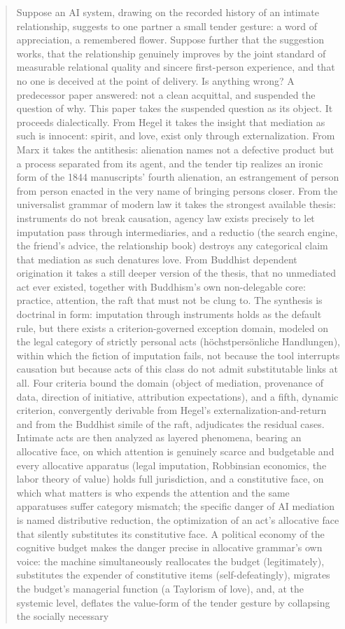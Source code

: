 \documentclass[11pt,a4paper]{article}
\begin{document}
\begin{abstract}
\noindent
Suppose an AI system, drawing on the recorded history of an intimate relationship, suggests to one partner a small tender gesture: a word of appreciation, a remembered flower. Suppose further that the suggestion works, that the relationship genuinely improves by the joint standard of measurable relational quality and sincere first-person experience, and that no one is deceived at the point of delivery. Is anything wrong? A predecessor paper answered: not a clean acquittal, and suspended the question of why. This paper takes the suspended question as its object. It proceeds dialectically. From Hegel it takes the insight that mediation as such is innocent: spirit, and love, exist only through externalization. From Marx it takes the antithesis: alienation names not a defective product but a process separated from its agent, and the tender tip realizes an ironic form of the 1844 manuscripts' fourth alienation, an estrangement of person from person enacted in the very name of bringing persons closer. From the universalist grammar of modern law it takes the strongest available thesis: instruments do not break causation, agency law exists precisely to let imputation pass through intermediaries, and a reductio (the search engine, the friend's advice, the relationship book) destroys any categorical claim that mediation as such denatures love. From Buddhist dependent origination it takes a still deeper version of the thesis, that no unmediated act ever existed, together with Buddhism's own non-delegable core: practice, attention, the raft that must not be clung to. The synthesis is doctrinal in form: imputation through instruments holds as the default rule, but there exists a criterion-governed exception domain, modeled on the legal category of strictly personal acts (h\"ochstpers\"onliche Handlungen), within which the fiction of imputation fails, not because the tool interrupts causation but because acts of this class do not admit substitutable links at all. Four criteria bound the domain (object of mediation, provenance of data, direction of initiative, attribution expectations), and a fifth, dynamic criterion, convergently derivable from Hegel's externalization-and-return and from the Buddhist simile of the raft, adjudicates the residual cases. Intimate acts are then analyzed as layered phenomena, bearing an allocative face, on which attention is genuinely scarce and budgetable and every allocative apparatus (legal imputation, Robbinsian economics, the labor theory of value) holds full jurisdiction, and a constitutive face, on which what matters is who expends the attention and the same apparatuses suffer category mismatch; the specific danger of AI mediation is named distributive reduction, the optimization of an act's allocative face that silently substitutes its constitutive face. A political economy of the cognitive budget makes the danger precise in allocative grammar's own voice: the machine simultaneously reallocates the budget (legitimately), substitutes the expender of constitutive items (self-defeatingly), migrates the budget's managerial function (a Taylorism of love), and, at the systemic level, deflates the value-form of the tender gesture by collapsing the socially necessary 
\end{abstract}
\end{document}
